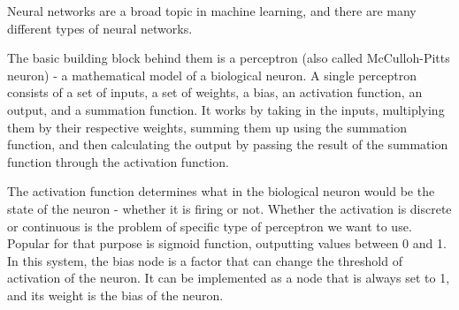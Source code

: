 \documentclass{article}
\begin{document}
Neural networks are a broad topic in machine learning, and there are many different types of neural networks.

The basic building block behind them is a 
perceptron (also called McCulloh-Pitts neuron) - a mathematical model of a biological neuron. A single perceptron consists of a set of inputs, a set of weights, a bias,
an activation function, an output, and a summation function.
It works by taking in the inputs, multiplying them by their respective weights, 
summing them up using the summation function, and then calculating the output by passing the result of the summation function through the activation function.

The activation function determines what in the biological neuron would be the state of the neuron - whether it is firing or not. Whether the activation
is discrete or continuous is the problem of specific type of perceptron we want to use. Popular for that purpose is sigmoid function, outputting values between 0 and 1.
In this system, the bias node is a factor that can change the threshold of activation of the neuron.
It can be implemented as a node that is always set to 1, and its weight is the bias of the neuron.
\end{document}
